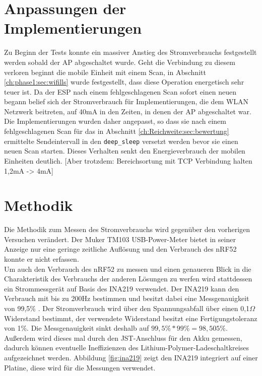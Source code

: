 \section{Anpassungen der Implementierungen}
Zu Beginn der Tests konnte ein massiver Anstieg des Stromverbrauchs festgestellt werden sobald der AP abgeschaltet wurde.
Geht die Verbindung zu diesem verloren beginnt die mobile Einheit mit einem Scan, in Abschnitt \ref{ch:phase1:sec:wifills} wurde festgestellt, dass diese Operation energetisch sehr teuer ist.
Da der ESP nach einem fehlgeschlagenen Scan sofort einen neuen begann belief sich der Stromverbrauch für Implementierungen, die dem WLAN Netzwerk beitreten, auf 40mA in den Zeiten, in denen der AP abgeschaltet war.
Die Implementierungen wurden daher angepasst, so dass sie nach einem fehlgeschlagenen Scan für das in Abschnitt \ref{ch:Reichweite:sec:bewertung} ermittelte Sendeintervall in den \texttt{deep\_sleep} versetzt werden bevor sie einen neuen Scan starten.
Dieses Verhalten senkt den Energieverbrauch der mobilen Einheiten deutlich.
[Aber trotzdem: Bereichsortung mit TCP Verbindung halten 1,2mA -> 4mA]

\section{Methodik}
Die Methodik zum Messen des Stromverbrauchs wird gegenüber den vorherigen Versuchen verändert.
Der Muker TM103 USB-Power-Meter bietet in seiner Anzeige nur eine geringe zeitliche Auflösung und den Verbrauch des nRF52 konnte er nicht erfassen.\\
Um auch den Verbrauch des nRF52 zu messen und einen genaueren Blick in die Charakteristik des Verbrauchs der anderen Lösungen zu werfen wird stattdessen ein Strommessgerät auf Basis des INA219 verwendet.
Der INA219 kann den Verbrauch mit bis zu 200Hz bestimmen und besitzt dabei eine Messgenauigkeit von 99,5\% \cite{texas2015ina}.
Der Stromverbrauch wird über den Spannungsabfall über einen 0,1$\Omega$ Widerstand bestimmt, der verwendete Widerstand besitzt eine Fertigungstoleranz von 1\%.
Die Messgenauigkeit sinkt deshalb auf $99,5\% * 99\% = 98,505\%$. \\
Außerdem wird dieses mal durch den JST-Anschluss für den Akku gemessen, dadurch können eventuelle Ineffizienzen des Lithium-Polymer-Ladeschaltkreises aufgezeichnet werden. 
Abbildung \ref{fig:ina219} zeigt den INA219 integriert auf einer Platine, diese wird für die Messungen verwendet.

